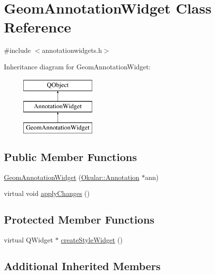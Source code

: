 \hypertarget{classGeomAnnotationWidget}{\section{Geom\+Annotation\+Widget Class Reference}
\label{classGeomAnnotationWidget}
}


{\ttfamily \#include $<$annotationwidgets.\+h$>$}

Inheritance diagram for Geom\+Annotation\+Widget\+:\begin{figure}[H]
\begin{center}
\leavevmode
\includegraphics[height=3.000000cm]{classGeomAnnotationWidget}
\end{center}
\end{figure}
\subsection*{Public Member Functions}
\begin{DoxyCompactItemize}
\item 
\hyperlink{classGeomAnnotationWidget_a278f4a0e4ddca2fe81fbfccfe3f8f52e}{Geom\+Annotation\+Widget} (\hyperlink{classOkular_1_1Annotation}{Okular\+::\+Annotation} $\ast$ann)
\item 
virtual void \hyperlink{classGeomAnnotationWidget_a188cb69dbb5fdd20620e1c75522c9bc4}{apply\+Changes} ()
\end{DoxyCompactItemize}
\subsection*{Protected Member Functions}
\begin{DoxyCompactItemize}
\item 
virtual Q\+Widget $\ast$ \hyperlink{classGeomAnnotationWidget_a2ae78739fb17d4f05bcc584265ed246f}{create\+Style\+Widget} ()
\end{DoxyCompactItemize}
\subsection*{Additional Inherited Members}


